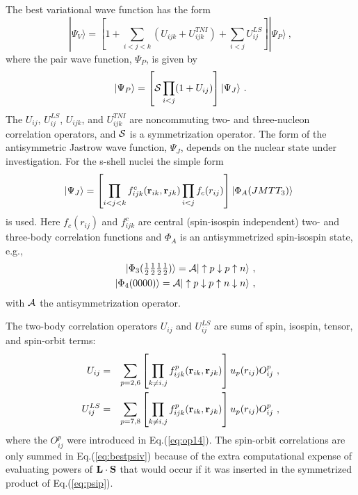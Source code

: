 The best variational wave function has the form~\cite{APW95}
\begin{equation}
     |\Psi_V\rangle = \left[1 + \sum_{i<j<k}(U_{ijk}+U^{TNI}_{ijk})
                              + \sum_{i<j}U^{LS}_{ij} \right]
                      |\Psi_P\rangle \ ,
\label{eq:bestpsiv}
\end{equation}
where the pair wave function, $\Psi_P$, is given by
\begin{equation}
     |\Psi_P\rangle = \left[ {\cal S}\prod_{i<j}(1+U_{ij}) \right]
                      |\Psi_J\rangle \ .
\label{eq:psip}
\end{equation}
The $U_{ij}$, $U^{LS}_{ij}$, $U_{ijk}$, and $U^{TNI}_{ijk}$ are noncommuting
two- and three-nucleon correlation operators, and ${\cal S}$ is a
symmetrization operator.
The form of the antisymmetric Jastrow wave function,
$\Psi_J$, depends on the nuclear state under investigation.
For the s-shell nuclei the simple form 
\begin{equation}
     |\Psi_J\rangle = \left[ \prod_{i<j<k}f^c_{ijk} ({\bf r}_{ik},{\bf r}_{jk})
                             \prod_{i<j}f_c(r_{ij}) \right]
                     |\Phi_A(JMTT_{3})\rangle \ 
\end{equation}
is used.
Here $f_c(r_{ij})$ and $f^c_{ijk}$ are central (spin-isospin independent) two-
and three-body correlation functions and $\Phi_A$ is an antisymmetrized
spin-isospin state, e.g.,
\begin{eqnarray}
 &&  |\Phi_{3}(\textstyle{1\over2} \textstyle{1\over2} \textstyle{1\over2} \textstyle{1\over2}) \rangle
        = {\cal A} |\uparrow p \downarrow p \uparrow n \rangle \ , \\
 &&  |\Phi_{4}(0 0 0 0) \rangle
        = {\cal A} |\uparrow p \downarrow p \uparrow n \downarrow n \rangle \ ,
\end{eqnarray}
with ${\cal A}$ the antisymmetrization operator.

The two-body correlation operators $U_{ij}$ and $U^{LS}_{ij}$ are sums
of spin, isospin, tensor, and spin-orbit terms:
\begin{eqnarray}
   U_{ij} &=& \sum_{p=2,6} \left[ \prod_{k\not=i,j}f^p_{ijk}({\bf r}_{ik}
              ,{\bf r}_{jk}) \right] u_p(r_{ij}) O^p_{ij} \ , \\
   U^{LS}_{ij} &=& \sum_{p=7,8} \left[ \prod_{k\not=i,j}f^p_{ijk}({\bf r}_{ik}
              ,{\bf r}_{jk}) \right] u_p(r_{ij}) O^p_{ij} \ ,
\end{eqnarray}
where the $O^p_{ij}$ were introduced in Eq.(\ref{eq:op14}).
The spin-orbit correlations are only summed in Eq.(\ref{eq:bestpsiv})
because of the extra computational expense of evaluating powers of
${\bf L\cdot S}$ that would occur if it was inserted in the symmetrized
product of Eq.(\ref{eq:psip}).

